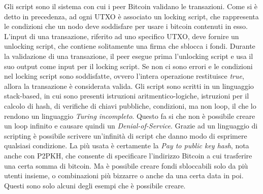 Gli script sono il sistema con cui i peer Bitcoin validano le transazioni. Come si è detto in precedenza, ad ogni UTXO è associato un locking script, che rappresenta le condizioni che un nodo deve soddisfare per usare i bitcoin contenuti in esso. L'input di una transazione, riferito ad uno specifico UTXO, deve fornire un unlocking script, che contiene solitamente una firma che sblocca i fondi. Durante la validazione di una transazione, il peer esegue prima l'unlocking script e usa il suo output come input per il locking script. Se non ci sono errori e le condizioni nel locking script sono soddisfatte, ovvero l'intera operazione restituisce \emph{true}, allora la transazione è considerata valida.
Gli script sono scritti in un linguaggio stack-based, in cui sono presenti istruzioni aritmentico-logiche, istruzioni per il calcolo di hash, di verifiche di chiavi pubbliche, condizioni, ma non loop, il che lo rendono un linguaggio \emph{Turing incompleto}. Questo fa si che non è possibile creare un loop infinito e causare quindi un \emph{Denial-of-Service}. Grazie ad un linguaggio di scripting è possibile scrivere un'infinità di script che danno modo di esprimere qualsiasi condizione. La più usata è certamente la \emph{Pay to public key hash}, nota anche con P2PKH, che consente di specificare l'indirizzo Bitcoin a cui trasferire una certa somma di bitcoin. Ma è possibile creare fondi sbloccabili solo da più utenti insieme, o combinazioni più bizzarre o anche da una certa data in poi. Questi sono solo alcuni degli esempi che è possibile creare.

